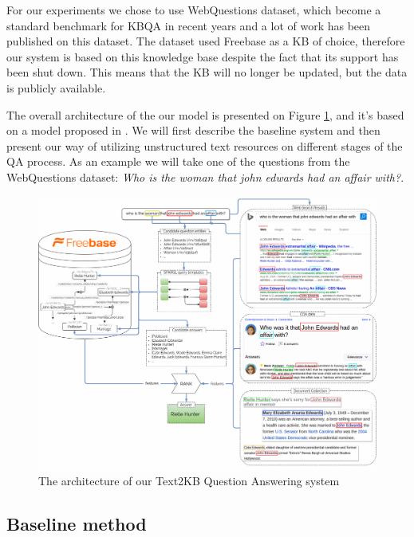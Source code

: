 
For our experiments we chose to use WebQuestions dataset, which become a standard benchmark for KBQA in recent years and a lot of work has been published on this dataset.
The dataset used Freebase as a KB of choice, therefore our system is based on this knowledge base despite the fact that its support has been shut down.
This means that the KB will no longer be updated, but the data is publicly available.

The overall architecture of the our model is presented on Figure \ref{fig:model}, and it's based on a model proposed in \cite{ACCU:2015}.
We will first describe the baseline system and then present our way of utilizing unstructured text resources on different stages of the QA process.
As an example we will take one of the questions from the WebQuestions dataset: \emph{Who is the woman that john edwards had an affair with?}.

\begin{figure}[t]
\centering
\includegraphics[width=\textwidth]{img/Text2KB_model}
\caption{The architecture of our Text2KB Question Answering system}
\label{fig:model}
\end{figure}

\subsection{Baseline method}

